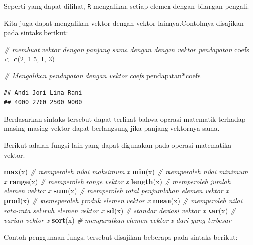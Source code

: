 \documentclass[]{book}
\newenvironment{Shaded}{\begin{snugshade}}{\end{snugshade}}
\newcommand{\KeywordTok}[1]{\textcolor[rgb]{0.13,0.29,0.53}{\textbf{#1}}}
\newcommand{\DecValTok}[1]{\textcolor[rgb]{0.00,0.00,0.81}{#1}}
\newcommand{\FloatTok}[1]{\textcolor[rgb]{0.00,0.00,0.81}{#1}}
\newcommand{\StringTok}[1]{\textcolor[rgb]{0.31,0.60,0.02}{#1}}
\newcommand{\CommentTok}[1]{\textcolor[rgb]{0.56,0.35,0.01}{\textit{#1}}}
\newcommand{\OperatorTok}[1]{\textcolor[rgb]{0.81,0.36,0.00}{\textbf{#1}}}
\newcommand{\NormalTok}[1]{#1}
\begin{document}
Seperti yang dapat dilihat, \texttt{R} mengalikan setiap elemen dengan
bilangan pengali.

Kita juga dapat mengalikan vektor dengan vektor lainnya.Contohnya
disajikan pada sintaks berikut:

\begin{Shaded}
\begin{Highlighting}[]
\CommentTok{# membuat vektor dengan panjang sama dengan dengan vektor pendapatan}
\NormalTok{coefs <-}\StringTok{ }\KeywordTok{c}\NormalTok{(}\DecValTok{2}\NormalTok{, }\FloatTok{1.5}\NormalTok{, }\DecValTok{1}\NormalTok{, }\DecValTok{3}\NormalTok{)}

\CommentTok{# Mengalikan pendapatan dengan vektor coefs}
\NormalTok{pendapatan}\OperatorTok{*}\NormalTok{coefs}
\end{Highlighting}
\end{Shaded}

\begin{verbatim}
## Andi Joni Lina Rani 
## 4000 2700 2500 9000
\end{verbatim}

Berdasarkan sintaks tersebut dapat terlihat bahwa operasi matematik
terhadap masing-masing vektor dapat berlangsung jika panjang vektornya
sama.

Berikut adalah fungsi lain yang dapat digunakan pada operasi matematika
vektor.

\begin{Shaded}
\begin{Highlighting}[]
\KeywordTok{max}\NormalTok{(x) }\CommentTok{# memperoleh nilai maksimum x}
\KeywordTok{min}\NormalTok{(x) }\CommentTok{# memperoleh nilai minimum x}
\KeywordTok{range}\NormalTok{(x) }\CommentTok{# memperoleh range vektor x}
\KeywordTok{length}\NormalTok{(x) }\CommentTok{# memperoleh jumlah elemen vektor x}
\KeywordTok{sum}\NormalTok{(x) }\CommentTok{# memperoleh total penjumlahan elemen vektor x}
\KeywordTok{prod}\NormalTok{(x) }\CommentTok{# memeperoleh produk elemen vektor x}
\KeywordTok{mean}\NormalTok{(x) }\CommentTok{# memperoleh nilai rata-rata seluruh elemen vektor x}
\KeywordTok{sd}\NormalTok{(x) }\CommentTok{# standar deviasi vektor x}
\KeywordTok{var}\NormalTok{(x) }\CommentTok{# varian vektor x}
\KeywordTok{sort}\NormalTok{(x) }\CommentTok{# mengurutkan elemen vektor x dari yang terbesar}
\end{Highlighting}
\end{Shaded}

Contoh penggunaan fungsi tersebut disajikan beberapa pada sintaks
berikut:
\end{document}
